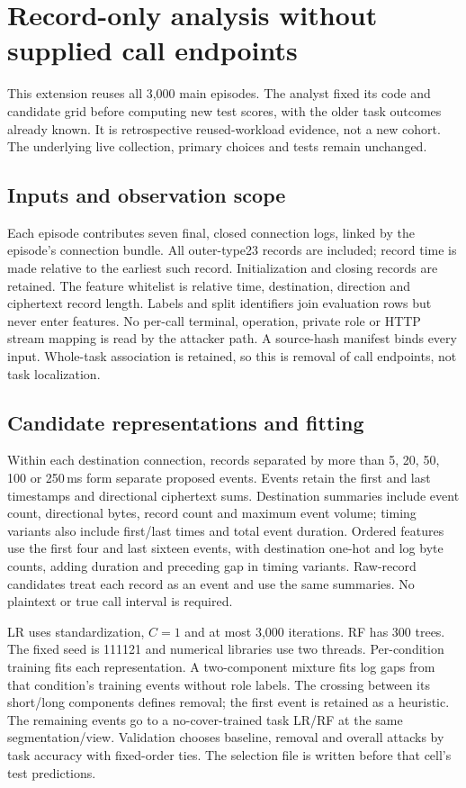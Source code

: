 \section{Record-only analysis without supplied call endpoints}\label{supp:no-call}
This extension reuses all 3,000 main episodes. The analyst fixed its code and candidate grid before computing new test scores, with the older task outcomes already known. It is retrospective reused-workload evidence, not a new cohort. The underlying live collection, primary choices and tests remain unchanged.

\subsection{Inputs and observation scope}
Each episode contributes seven final, closed connection logs, linked by the episode's connection bundle. All outer-type23 records are included; record time is made relative to the earliest such record. Initialization and closing records are retained. The feature whitelist is relative time, destination, direction and ciphertext record length. Labels and split identifiers join evaluation rows but never enter features. No per-call terminal, operation, private role or HTTP stream mapping is read by the attacker path. A source-hash manifest binds every input. Whole-task association is retained, so this is removal of call endpoints, not task localization.

\subsection{Candidate representations and fitting}
Within each destination connection, records separated by more than 5, 20, 50, 100 or 250\,ms form separate proposed events. Events retain the first and last timestamps and directional ciphertext sums. Destination summaries include event count, directional bytes, record count and maximum event volume; timing variants also include first/last times and total event duration. Ordered features use the first four and last sixteen events, with destination one-hot and log byte counts, adding duration and preceding gap in timing variants. Raw-record candidates treat each record as an event and use the same summaries. No plaintext or true call interval is required.

LR uses standardization, $C=1$ and at most 3,000 iterations. RF has 300 trees. The fixed seed is 111121 and numerical libraries use two threads. Per-condition training fits each representation. A two-component mixture fits log gaps from that condition's training events without role labels. The crossing between its short/long components defines removal; the first event is retained as a heuristic. The remaining events go to a no-cover-trained task LR/RF at the same segmentation/view. Validation chooses baseline, removal and overall attacks by task accuracy with fixed-order ties. The selection file is written before that cell's test predictions.

